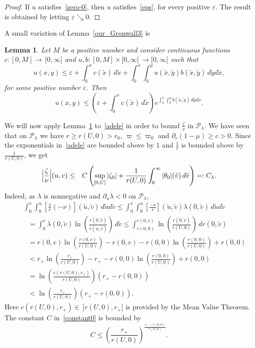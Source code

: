 \documentclass[a4paper,11pt,oneside,reqno]{amsart}
\newtheorem{Lem}[Thm]{Lemma}
\newcommand{\cal}{\mathcal}
\newcommand{\eps}{\varepsilon}
\begin{document}
\begin{proof}
If $u$ satisfies~\eqref{zero-0}, then $u$ satisfies~\eqref{eps}, for every positive $\eps$. The result is obtained by letting $\eps\searrow 0$.
\end{proof}

A small variation of Lemma~\ref{our_Gronwall3} is
\begin{Lem}\label{our_Gronwall4}
Let $M$ be a positive number
and consider continuous functions $c:[0,M]\to\,[0,\infty[$ and $u,b:[0,M]\times[0,\infty[\,\to[0,\infty[$ such that
\begin{equation}\label{epsbis}
u(x,y)\leq \eps+\int_{0}^xc(\tilde x)\,d\tilde x+\int_{0}^x\int_{0}^yu(\tilde x,\tilde y)b(\tilde x,\tilde y)\,d\tilde yd\tilde x,
\end{equation}
for some positive number $\eps$.
Then
\begin{equation}\label{gronwall3bis}
u(x,y)\leq \left(\eps+\int_{0}^xc(\tilde x)\,d\tilde x\right)e^{\int_{0}^x\int_{0}^yb(\tilde x,\tilde y)\,d\tilde yd\tilde x}.
\end{equation}
\end{Lem}

We will now apply Lemma~\ref{our_Gronwall4} to~\eqref{adele} in order to bound $\frac{\zeta}{\nu}$ in ${\cal P}_\lambda$. We have seen that on ${\cal P}_\lambda$ we have $r\geq r(U,0)>r_0$,
$\varpi\leq\varpi_0$ and $\partial_r(1-\mu)\geq c>0$. Since the exponentials in~\eqref{adele} are bounded above by $1$ and $\frac{1}{r}$ is bounded
above by $\frac{1}{r(U,0)}$, we get
\begin{eqnarray}
\Bigl|\frac{\zeta}{\nu}\Bigr|(u,v)
&\leq& C\left(\sup_{[0,U]}|\zeta_0|+\frac{1}{r(U,0)}\int_0^\infty|\theta_0|(\tilde v)\,d\tilde v\right)=:C_\lambda.
\label{constant0}
\end{eqnarray}
Indeed, as $\lambda$ is nonnegative and $\partial_u\lambda<0$ on ${\cal P}_\lambda$,
\begin{eqnarray*}
&&\int_0^v\int_0^u\left[\frac{\lambda}{r}(-\nu)\right](\tilde u,\tilde v)\,d\tilde ud\tilde v\leq
\int_0^v\int_0^u\left[\frac{-\nu}{r}\right](\tilde u,\tilde v)\lambda(0,\tilde v)\,d\tilde ud\tilde v\\
&&\ \ \ =
\int_0^v\lambda(0,\tilde v)\ln\left(\frac{r(0,\tilde v)}{r(u,\tilde v)}\right)\,d\tilde v
\leq
\int_{r(0,0)}^{r(0,v)}\ln\left(\frac{r(0,\tilde v)}{r(U,0)}\right)\,dr(0,\tilde v)\\
&&\ \ \  =r(0,v)\ln\left(\frac{r(0,v)}{r(U,0)}\right)-r(0,v)-r(0,0)\ln\left(\frac{r(0,0)}{r(U,0)}\right)+r(0,0)\\
&&\ \ \ <r_+\ln\left(\frac{r_+}{r(U,0)}\right)-r_+-r(0,0)\ln\left(\frac{r(0,0)}{r(U,0)}\right)+r(0,0)\\
&&\ \ \ =\ln\left(\frac{c(r(U,0),r_+)}{r(U,0)}\right)(r_+-r(0,0))\\
&&\ \ \ < \ln\left(\frac{r_+}{r(U,0)}\right)(r_+-r(0,0)).
\end{eqnarray*}
Here $c(r(U,0),r_+)\in\,]r(U,0),r_+[$ is provided by the Mean Value Theorem.
The constant $C$ in~\eqref{constant0} is bounded by
$$
C\leq\left(\frac{r_+}{r(U,0)}\right)^{\frac{r_+-r(0,0)}{r(U,0)}}.
$$
\end{document}

